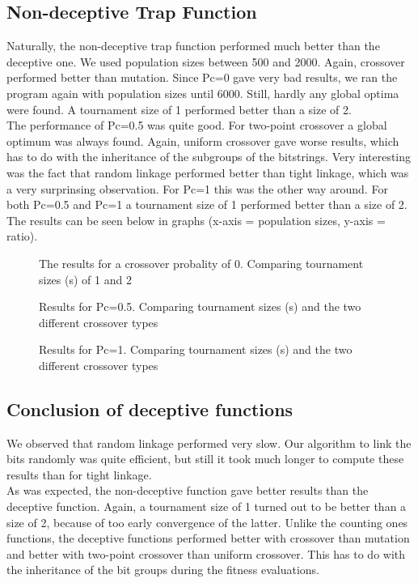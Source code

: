 \documentclass[10pt,a4paper,onecolumn]{article}
\begin{document}
\subsection{Non-deceptive Trap Function}
Naturally, the non-deceptive trap function performed much better than the deceptive one. We used population sizes between 500 and 2000. Again, crossover performed better than mutation. Since Pc=0 gave very bad results, we ran the program again with population sizes until 6000. Still, hardly any global optima were found. A tournament size of 1 performed better than a size of 2. \\
The performance of Pc=0.5 was quite good. For two-point crossover a global optimum was always found.  Again, uniform crossover gave worse results, which has to do with the inheritance of the subgroups of the bitstrings. Very interesting was the fact that random linkage performed better than tight linkage, which was a very surprinsing observation. For Pc=1 this was the other way around. For both Pc=0.5 and Pc=1 a tournament size of 1 performed better than a size of 2.
The results can be seen below in graphs (x-axis = population sizes, y-axis = ratio).

\begin{figure}
    \centering
    \caption{The results for a crossover probality of 0. Comparing tournament sizes (s) of 1 and 2}
\end{figure}

\begin{figure}
    \centering
    \caption{Results for Pc=0.5. Comparing tournament sizes (s) and the two different crossover types}
\end{figure}

\begin{figure}
    \centering
    \caption{Results for Pc=1. Comparing tournament sizes (s) and the two different crossover types}
\end{figure}

\subsection{Conclusion of deceptive functions}

We observed that random linkage performed very slow. Our algorithm to link the bits randomly was quite efficient, but still it took much longer to compute these results than for tight linkage. \\
As was expected, the non-deceptive function gave better results than the deceptive function. Again, a tournament size of 1 turned out to be better than a size of 2, because of too early convergence of the latter. Unlike the counting ones functions, the deceptive functions performed better with crossover than mutation and better with two-point crossover than uniform crossover. This has to do with the inheritance of the bit groups during the fitness evaluations.
\end{document}
